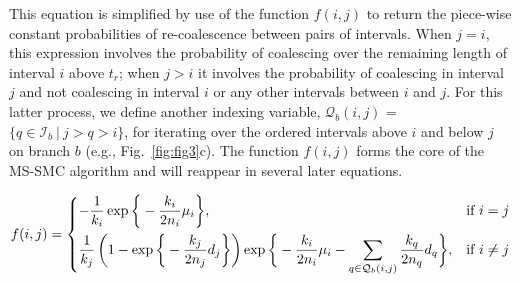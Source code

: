 \documentclass[11pt]{article}
\begin{document}
\noindent This equation is simplified by use of the function $f(i,j)$
to return the piece-wise constant probabilities of re-coalescence between
pairs of intervals. When $j=i$, this expression involves the probability of 
coalescing over the remaining length of interval $i$ above $t_r$; 
when $j>i$ it involves the probability of coalescing in interval 
$j$ and not coalescing in interval $i$ or any other intervals 
between $i$ and $j$. For this latter process, we define another
indexing variable, $\mathcal{Q}_b(i,j)$ = $\{q \in \mathcal{I}_b ~|~ j > q > i\}$, 
for iterating over the ordered intervals above $i$ and below $j$ 
on branch $b$ (e.g., Fig.~\ref{fig:fig3}c).
The function $f(i,j)$ forms the core of the MS-SMC algorithm and 
will reappear in several later equations.

\begin{equation}
\begin{aligned}	
	f(i,j) = 
	\begin{dcases}
		- \frac{1}{k_i} \exp \bigg\{-\frac{k_i}{2n_i}\mu_i \bigg\}, 
		& \text{if } i=j\\
		\frac{1}{k_j} \left(1 - \exp \bigg\{ -\frac{k_j}{2n_j} d_j \bigg\} 
		\right)
		\exp \bigg\{ -\frac{k_i}{2n_i}\mu_i - 
		\sum_{q \in \mathcal{Q}_b(i,j)} \frac{k_q}{2n_q} d_q \bigg \}, 
		& \text{if } i\ne j\\
	\end{dcases}
\end{aligned}
\end{equation}




\end{document}
